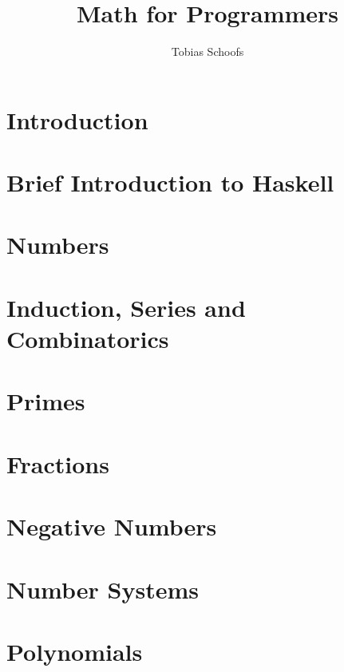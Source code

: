 \documentclass{scrbook}
\begin{document}
\setlength{\parindent}{0pt}
\setlength{\parskip}{8pt}

\title {Math for Programmers}
\author {Tobias Schoofs}
\maketitle

\chapter{Introduction}

\chapter{Brief Introduction to Haskell}

\chapter{Numbers}

\chapter{Induction, Series and Combinatorics}\label{chap:series}

\chapter{Primes}

\chapter{Fractions}

\chapter{Negative Numbers}

\chapter{Number Systems}

\chapter{Polynomials}
\end{document}

